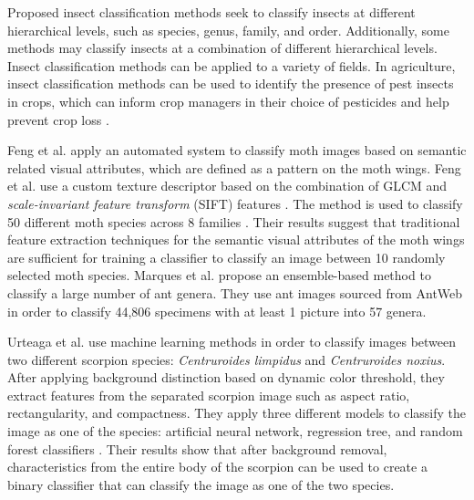 \documentclass{aci}
\numberwithin{equation}{section}
\begin{document}
Proposed insect classification methods seek to classify insects at different
hierarchical levels, such as species, genus, family, and order. Additionally,
some methods may classify insects at a combination of different hierarchical
levels. Insect classification methods can be applied to a variety of fields. In
agriculture, insect classification methods can be used to identify the presence
of pest insects in crops, which can inform crop managers in their choice of
pesticides and help prevent crop loss \cite{liu_pestnet_2019,
    kasinathan_machine_2021}.

Feng et al. \cite{feng_automated_2013} apply an automated system to classify
moth images based on semantic related visual attributes, which are defined as a
pattern on the moth wings. Feng et al. \cite{feng_automated_2013} use a custom
texture descriptor based on the combination of GLCM and \textit{scale-invariant
    feature transform} (SIFT) features \cite{gotlieb_texture_1990,
    lowe_distinctive_2004}. The method is used to classify 50 different moth species
across 8 families \cite{feng_automated_2013}. Their results
\cite{feng_automated_2013} suggest that traditional feature extraction
techniques for the semantic visual attributes of the moth wings are sufficient
for training a classifier to classify an image between 10 randomly selected moth
species. Marques et al. \cite{marques_ant_2018} propose an ensemble-based method
to classify a large number of ant genera. They use ant images sourced from AntWeb
in order to classify 44,806 specimens with at least 1 picture into 57 genera.

Urteaga et al. \cite{urteaga_scorpions_2016} use machine learning methods in
order to classify images between two different scorpion species:
\textit{Centruroides limpidus} and \textit{Centruroides noxius}. After applying
background distinction based on dynamic color threshold, they extract features
from the separated scorpion image such as aspect ratio, rectangularity, and
compactness. They apply three different models to classify the image as one of
the species: artificial neural network, regression tree, and random forest
classifiers \cite{urteaga_scorpions_2016}. Their results show that after
background removal, characteristics from the entire body of the scorpion can be
used to create a binary classifier that can classify the image as one of the two
species.
\end{document}
